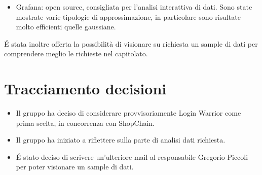 \begin{itemize}
		\item Grafana: open source, consigliata per l'analisi interattiva di dati. Sono state mostrate varie tipologie di approssimazione, in particolare sono risultate molto efficienti quelle gaussiane.
\end{itemize}

\noindent 
\'E stata inoltre offerta la possibilità di visionare su richiesta un sample di dati per comprendere meglio le richieste nel capitolato.

\section{Tracciamento decisioni}

\begin{itemize}
	\item Il gruppo ha deciso di considerare provvisoriamente Login Warrior come prima scelta, in concorrenza con ShopChain.
	\item Il gruppo ha iniziato a riflettere sulla parte di analisi dati richiesta.
	\item \'E stato deciso di scrivere un'ulteriore mail al responsabile Gregorio Piccoli per poter visionare un sample di dati.
\end{itemize}